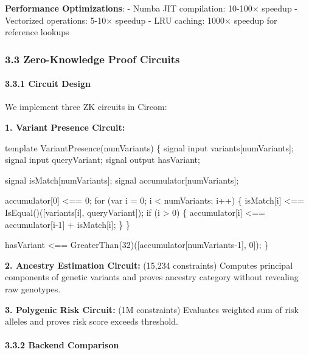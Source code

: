 \documentclass[
  11pt,
]{article}
\newenvironment{Shaded}{}{}
\newcommand{\NormalTok}[1]{#1}
\begin{document}
\textbf{Performance Optimizations}: - Numba JIT compilation: 10-100×
speedup - Vectorized operations: 5-10× speedup - LRU caching: 1000×
speedup for reference lookups

\subsubsection{3.3 Zero-Knowledge Proof
Circuits}\label{zero-knowledge-proof-circuits}

\paragraph{3.3.1 Circuit Design}\label{circuit-design}

We implement three ZK circuits in Circom:

\textbf{1. Variant Presence Circuit:}

\begin{Shaded}
\begin{Highlighting}[]
\NormalTok{template VariantPresence(numVariants) \{}
\NormalTok{    signal input variants[numVariants];}
\NormalTok{    signal input queryVariant;}
\NormalTok{    signal output hasVariant;}

\NormalTok{    signal isMatch[numVariants];}
\NormalTok{    signal accumulator[numVariants];}

\NormalTok{    accumulator[0] \textless{}== 0;}
\NormalTok{    for (var i = 0; i \textless{} numVariants; i++) \{}
\NormalTok{        isMatch[i] \textless{}== IsEqual()([variants[i], queryVariant]);}
\NormalTok{        if (i \textgreater{} 0) \{}
\NormalTok{            accumulator[i] \textless{}== accumulator[i{-}1] + isMatch[i];}
\NormalTok{        \}}
\NormalTok{    \}}

\NormalTok{    hasVariant \textless{}== GreaterThan(32)([accumulator[numVariants{-}1], 0]);}
\NormalTok{\}}
\end{Highlighting}
\end{Shaded}

\textbf{2. Ancestry Estimation Circuit:} (15,234 constraints) Computes
principal components of genetic variants and proves ancestry category
without revealing raw genotypes.

\textbf{3. Polygenic Risk Circuit:} (1M constraints) Evaluates weighted
sum of risk alleles and proves risk score exceeds threshold.

\paragraph{3.3.2 Backend Comparison}\label{backend-comparison}
\end{document}
